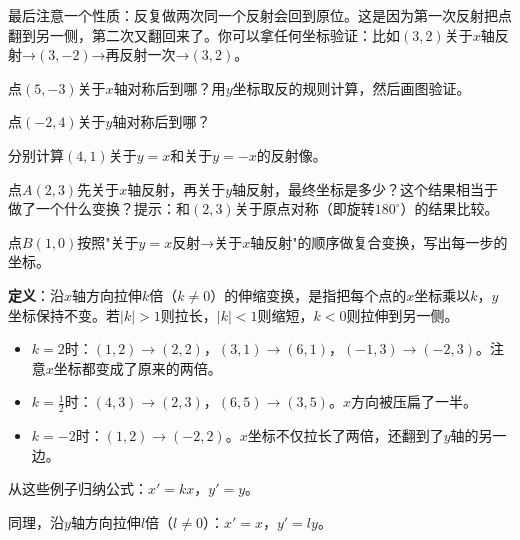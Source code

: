 最后注意一个性质：反复做两次同一个反射会回到原位。这是因为第一次反射把点翻到另一侧，第二次又翻回来了。你可以拿任何坐标验证：比如$(3,2)$关于$x$轴反射→$(3,-2)$→再反射一次→$(3,2)$。

\begin{exercise}
\item 点$(5,-3)$关于$x$轴对称后到哪？用$y$坐标取反的规则计算，然后画图验证。
\item 点$(-2,4)$关于$y$轴对称后到哪？
\item 分别计算$(4,1)$关于$y=x$和关于$y=-x$的反射像。
\item 点$A(2,3)$先关于$x$轴反射，再关于$y$轴反射，最终坐标是多少？这个结果相当于做了一个什么变换？提示：和$(2,3)$关于原点对称（即旋转$180^\circ$）的结果比较。
\item 点$B(1,0)$按照"关于$y=x$反射→关于$x$轴反射"的顺序做复合变换，写出每一步的坐标。
\end{exercise}


\textbf{定义}：沿$x$轴方向拉伸$k$倍（$k\neq0$）的伸缩变换，是指把每个点的$x$坐标乘以$k$，$y$坐标保持不变。若$|k|>1$则拉长，$|k|<1$则缩短，$k<0$则拉伸到另一侧。

\begin{center}
\end{center}

\begin{itemize}
\item $k=2$时：$(1,2)\to(2,2)$，$(3,1)\to(6,1)$，$(-1,3)\to(-2,3)$。注意$x$坐标都变成了原来的两倍。
\item $k=\frac12$时：$(4,3)\to(2,3)$，$(6,5)\to(3,5)$。$x$方向被压扁了一半。
\item $k=-2$时：$(1,2)\to(-2,2)$。$x$坐标不仅拉长了两倍，还翻到了$y$轴的另一边。
\end{itemize}

从这些例子归纳公式：$x'=kx$，$y'=y$。

同理，沿$y$轴方向拉伸$l$倍（$l\neq0$）：$x'=x$，$y'=ly$。

